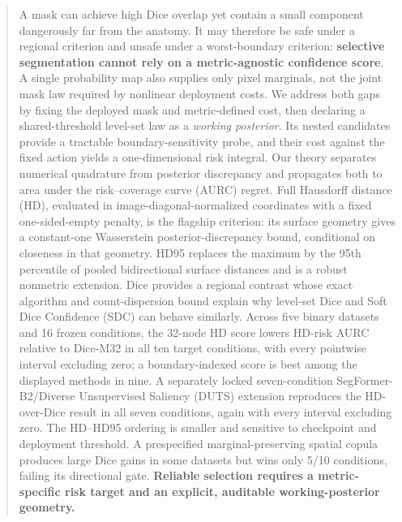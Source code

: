 \begin{abstract}
A mask can achieve high Dice overlap yet contain a small component dangerously
far from the anatomy. It may therefore be safe under a regional criterion and
unsafe under a worst-boundary criterion: \textbf{selective segmentation cannot rely on a
metric-agnostic confidence score}. A single probability map also supplies only
pixel marginals, not the joint mask law required by nonlinear deployment costs.
We address both gaps by fixing the deployed mask and metric-defined cost, then declaring a
shared-threshold level-set law as a \emph{working posterior}. Its nested
candidates provide a tractable boundary-sensitivity probe, and their cost against the fixed
action yields a one-dimensional risk integral. Our theory separates numerical
quadrature from posterior discrepancy and propagates both to area under the
risk--coverage curve (AURC) regret. Full Hausdorff distance (HD), evaluated in
image-diagonal-normalized coordinates with a fixed one-sided-empty penalty, is
the flagship criterion: its surface geometry gives a constant-one Wasserstein
posterior-discrepancy bound, conditional on closeness in that geometry. HD95 replaces the maximum by the 95th percentile of pooled bidirectional surface distances and
is a robust nonmetric extension. Dice provides a regional contrast whose exact
algorithm and count-dispersion bound explain why level-set Dice and Soft Dice
Confidence (SDC) can behave similarly. Across five binary datasets and 16 frozen conditions, the
32-node HD score lowers HD-risk AURC relative to Dice-M32 in all ten target
conditions, with every pointwise interval excluding zero; a boundary-indexed
score is best among the displayed methods in nine. A separately locked
seven-condition SegFormer-B2/Diverse Unsupervised Saliency (DUTS) extension
reproduces the HD-over-Dice result in all seven conditions, again with every
interval excluding zero. The HD--HD95 ordering is
smaller and sensitive to checkpoint and deployment threshold. A prespecified
marginal-preserving spatial copula produces large Dice gains in some datasets
but wins only 5/10 conditions, failing its directional gate. \textbf{Reliable
selection requires a metric-specific risk target and an explicit, auditable
working-posterior geometry.}
\end{abstract}
